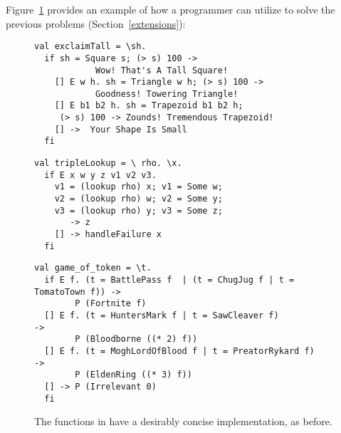 \documentclass[manuscript,screen,review, 12pt, nonacm]{acmart}
\begin{document}
    Figure~\ref{fig:vminusfuncs} provides an example of how a programmer can
    utilize \VMinus to solve the previous problems (Section~\ref{extensions}): 
    
    
    \begin{figure}[ht] 
      \begin{minipage}[h]{0.54\linewidth}
        \vmlst 
        \begin{lstlisting}[numbers=none, basicstyle=\tiny, xleftmargin=.2em,
          showstringspaces=false,
          frame=single]
val exclaimTall = \sh.
  if sh = Square s; (> s) 100 -> 
            Wow! That's A Tall Square!  
    [] E w h. sh = Triangle w h; (> s) 100 ->
            Goodness! Towering Triangle!
    [] E b1 b2 h. sh = Trapezoid b1 b2 h; 
     (> s) 100 -> Zounds! Tremendous Trapezoid!
    [] ->  Your Shape Is Small
  fi 
  \end{lstlisting}
          \label{fig:vmexclaimtall} 
      \end{minipage}%
      \begin{minipage}[h]{0.5\linewidth}
        \vmlst 
        \begin{lstlisting}[numbers=none, basicstyle=\tiny, xleftmargin=2em,
                      frame=single]
val tripleLookup = \ rho. \x.
  if E x w y z v1 v2 v3. 
    v1 = (lookup rho) x; v1 = Some w; 
    v2 = (lookup rho) w; v2 = Some y; 
    v3 = (lookup rho) y; v3 = Some z; 
       -> z 
    [] -> handleFailure x
  fi 
   \end{lstlisting}
            \label{fig:vmtriplelookup} 
        \vspace{4ex}
      \end{minipage} 
      \begin{minipage}[h]{\linewidth}
        \vmlst 
        \begin{lstlisting}[numbers=none, basicstyle=\tiny, xleftmargin=9em,
          showstringspaces=false,
          frame=single]
val game_of_token = \t. 
  if E f. (t = BattlePass f  | (t = ChugJug f | t = TomatoTown f)) -> 
        P (Fortnite f)
  [] E f. (t = HuntersMark f | t = SawCleaver f)                   -> 
        P (Bloodborne ((* 2) f))
  [] E f. (t = MoghLordOfBlood f | t = PreatorRykard f)            -> 
        P (EldenRing ((* 3) f))
  [] -> P (Irrelevant 0)
  fi 
\end{lstlisting}
          \label{fig:vmgot}
      \vspace{4ex}
      \end{minipage}%
      \caption{The functions in \VMinus have a desirably concise
      implementation, as before.}
  \label{fig:vminusfuncs}
    \end{figure}   
\end{document}
